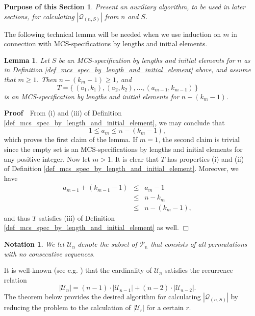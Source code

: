 \documentclass{article}
\newtheorem{lemma}[theorem]{Lemma}
\newtheorem{notation}[theorem]{Notation}
\newtheorem{purpose}{Purpose of this Section}
\def\proof{\par \noindent              %
\mbox{\bf Proof}\ \,}                  %
\def\endproof{\mbox{$\Box$} \par }     %
\begin{document}
\begin{purpose}
Present an auxiliary algorithm, to be used in later sections,
for calculating $|{\mathcal Q}_{(n,S)}|$ from $n$ and $S$.
\end{purpose}

The following technical lemma will be needed when we use induction on $m$ in connection with
MCS-specifications by lengths and initial elements.

\begin{lemma}\label{lemma_ind_on_m} 
  Let $S$ be an MCS-specification by lengths and initial elements for $n$ as in
  Definition \ref{def_mcs_spec_by_length_and_initial_element}
  above, and assume that $m\geq 1$. Then $n-(k_m-1) \geq 1$, and
  $$T = \{\,(a_1, k_1), (a_2, k_2), \ldots,(a_{m-1}, k_{m-1})\,\}$$
  is an MCS-specification by lengths and initial elements for $n-(k_m-1)$.
\end{lemma}

\proof
From (i) and (iii) of Definition \ref{def_mcs_spec_by_length_and_initial_element}, we may conclude that
$$1 \leq a_m \leq n - (k_m - 1),$$ which proves the first claim of the lemma.
If $m=1$, the second claim is trivial since the empty set is an MCS-specifications by lengths
and initial elements for any positive integer. Now let $m > 1$. It is clear that $T$ has properties
(i) and (ii) of Definition \ref{def_mcs_spec_by_length_and_initial_element}. Moreover, we have 
\begin{eqnarray*}
  a_{m-1} + (k_{m-1} - 1) & \leq & a_m - 1 \\
                          & \leq & n - k_m \\
                          & \leq & n - (k_m-1),
\end{eqnarray*} 
and thus $T$ satisfies (iii) of Definition \ref{def_mcs_spec_by_length_and_initial_element} as well.
\endproof

\begin{notation}
  We let ${\mathcal U}_n$ denote the subset of ${\mathcal P}_n$ that consists of all permutations with no consecutive
  sequences.
\end{notation}

It is well-known (see e.g. \cite{JedYang}) that the cardinality of ${\mathcal U}_n$ satisfies the recurrence relation
$$
|{\mathcal U}_n| = (n-1) \cdot |{\mathcal U}_{n-1}| + (n-2) \cdot |{\mathcal U}_{n-2}|.
$$
The theorem below provides the desired algorithm for calculating $|{\mathcal Q}_{(n,S)}|$ by reducing the
problem to the calculation of $|{\mathcal U}_r|$ for a certain $r$.
 
\end{document}
